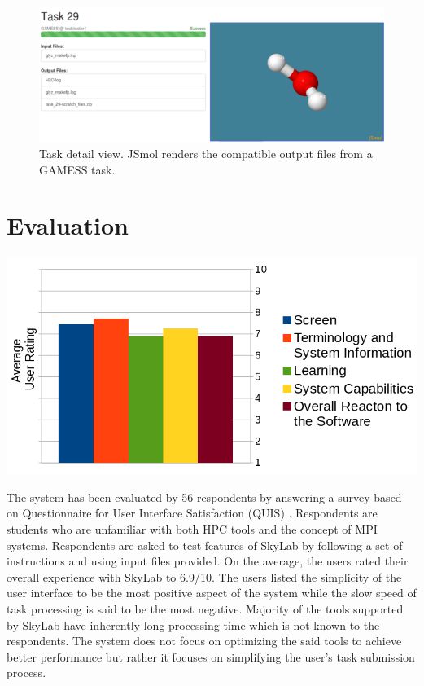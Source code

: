 \begin{figure}			
	\includegraphics[scale=0.35]{./images/jsmol_detail_view_2.png}			
	\caption{\label{fig:jsmol}Task detail view.  JSmol \cite{IJCH:IJCH201300024} renders the compatible output files from a GAMESS task.}			
\end{figure}	
	
	
\section{Evaluation}
	\begin{center}			
			\includegraphics[scale=0.32]{./images/uat_graph.png}			
	\end{center}
	The system has been evaluated by 56 respondents by answering a survey based on Questionnaire for User Interface Satisfaction (QUIS) \cite{chin1988development}. Respondents are students who are unfamiliar with both HPC tools and the concept of MPI systems.  Respondents are asked to test features of SkyLab by following a set of instructions and using input files provided. On the average, the users rated their overall experience with SkyLab to 6.9/10. The users listed the simplicity of the user interface to be the most positive aspect of the system while the slow speed of task processing is said to be the most negative. Majority of the tools supported by SkyLab have inherently long processing time which is not known to the respondents. The system does not focus on optimizing the said tools to achieve better performance but rather it focuses on simplifying the user's task submission process. 

